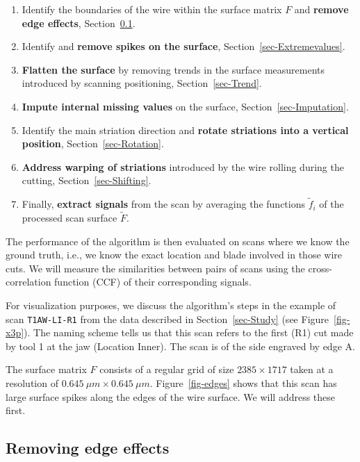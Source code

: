 \documentclass[
  authoryear,
  preprint,
  5p,
  twocolumn]{elsarticle}
\providecommand{\tightlist}{%
  \setlength{\itemsep}{0pt}\setlength{\parskip}{0pt}}\usepackage{longtable,booktabs,array}
\begin{document}
\begin{enumerate}
\def\labelenumi{\arabic{enumi}.}
\tightlist
\item
  Identify the boundaries of the wire within the surface matrix \(F\)
  and \textbf{remove edge effects}, Section~\ref{sec-Edgeeffects}.
\item
  Identify and \textbf{remove spikes on the surface},
  Section~\ref{sec-Extremevalues}.
\item
  \textbf{Flatten the surface} by removing trends in the surface
  measurements introduced by scanning positioning,
  Section~\ref{sec-Trend}.
\item
  \textbf{Impute internal missing values} on the surface,
  Section~\ref{sec-Imputation}.
\item
  Identify the main striation direction and \textbf{rotate striations
  into a vertical position}, Section~\ref{sec-Rotation}.
\item
  \textbf{Address warping of striations} introduced by the wire rolling
  during the cutting, Section~\ref{sec-Shifting}.
\item
  Finally, \textbf{extract signals} from the scan by averaging the
  functions \(\tilde{f}_i\) of the processed scan surface \(\tilde{F}\).
\end{enumerate}

The performance of the algorithm is then evaluated on scans where we
know the ground truth, i.e., we know the exact location and blade
involved in those wire cuts. We will measure the similarities between
pairs of scans using the cross-correlation function (CCF) of their
corresponding signals.

For visualization purposes, we discuss the algorithm's steps in the
example of scan \texttt{T1AW-LI-R1} from the data described in
Section~\ref{sec-Study} (see Figure~\ref{fig-x3p}). The naming scheme
tells us that this scan refers to the first (R1) cut made by tool 1 at
the jaw (Location Inner). The scan is of the side engraved by edge A.

The surface matrix \(F\) consists of a regular grid of size
\(2385 \times 1717\) taken at a resolution of
\(0.645\ \mu m \times 0.645\ \mu m\). Figure~\ref{fig-edges} shows that
this scan has large surface spikes along the edges of the wire surface.
We will address these first.

\subsection{Removing edge effects}\label{sec-Edgeeffects}
\end{document}
